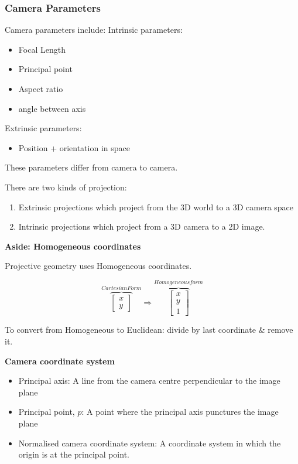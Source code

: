 \documentclass{beamer}
\begin{document}
  \begin{frame}[allowframebreaks]
    \frametitle{Camera Parameters}
    Camera parameters include:
    Intrinsic parameters:
    \begin{itemize}
      \item Focal Length
      \item Principal point
      \item Aspect ratio
      \item angle between axis
    \end{itemize}
    Extrinsic parameters:
    \begin{itemize}
      \item Position + orientation in space
    \end{itemize}

    These parameters differ from camera to camera.

    \framebreak

    There are two kinds of projection:
    \begin{enumerate}
      \item Extrinsic projections which project from the 3D world to a 3D camera space
      \item Intrinsic projections which project from a 3D camera to a 2D image.
    \end{enumerate}

    \textbf{Aside: Homogeneous coordinates}

    Projective geometry uses Homogeneous coordinates.

    \[
      \overbrace{\begin{bmatrix}
x\\y
\end{bmatrix}}^{ Cartesian Form }
\Rightarrow \overbrace{\begin{bmatrix}
x \\y \\1
  \end{bmatrix}}^{Homogeneous form}
\]

To convert from Homogeneous to Euclidean: divide by last coordinate \& remove it.

\framebreak

\textbf{Camera coordinate system}

\begin{itemize}
  \item Principal axis: A line from the camera centre perpendicular to the image plane
  \item Principal point, $p$: A point where the principal axis punctures the image plane
  \item Normalised camera coordinate system: A coordinate system in which the origin is at the principal point.
\end{itemize}


\end{frame}
\end{document}
